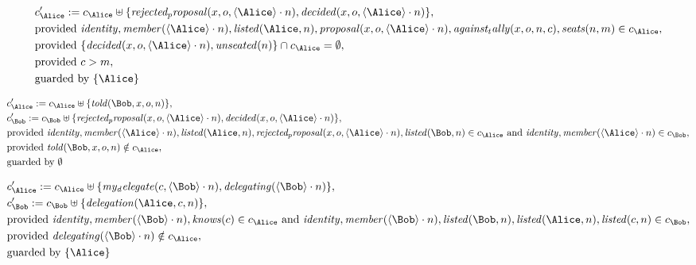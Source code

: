 \begin{align*}
&
c'_
{
\Alice
}
 := 
c_
{
\Alice
}
 \uplus 
\{
\mathit{
rejected_proposal
}
(
x
,
o
,
\langle
\Alice
\rangle
\cdot
n
)
,
\mathit{
decided
}
(
x
,
o
,
\langle
\Alice
\rangle
\cdot
n
)
\}
,\\
&
\text{provided } 
\mathit{
identity
}
,
\mathit{
member
}
(
\langle
\Alice
\rangle
\cdot
n
)
,
\mathit{
listed
}
(
\Alice
,
n
)
,
\mathit{
proposal
}
(
x
,
o
,
\langle
\Alice
\rangle
\cdot
n
)
,
\mathit{
against_tally
}
(
x
,
o
,
n
,
c
)
,
\mathit{
seats
}
(
n
,
m
)
 \in c_
{
\Alice
}
,\\
&
\text{provided } 
\{
\mathit{
decided
}
(
x
,
o
,
\langle
\Alice
\rangle
\cdot
n
)
,
\mathit{
unseated
}
(
n
)
\}
 \cap c_
{
\Alice
}
 = \emptyset
,\\
&
\text{provided } 
c
>
m
,\\
&
\text{guarded by } \{
\Alice
\}
\end{align*}

\begin{align*}
&
c'_
{
\Alice
}
 := 
c_
{
\Alice
}
 \uplus 
\{
\mathit{
told
}
(
\Bob
,
x
,
o
,
n
)
\}
,\\
&
c'_
{
\Bob
}
 := 
c_
{
\Bob
}
 \uplus 
\{
\mathit{
rejected_proposal
}
(
x
,
o
,
\langle
\Alice
\rangle
\cdot
n
)
,
\mathit{
decided
}
(
x
,
o
,
\langle
\Alice
\rangle
\cdot
n
)
\}
,\\
&
\text{provided } 
\mathit{
identity
}
,
\mathit{
member
}
(
\langle
\Alice
\rangle
\cdot
n
)
,
\mathit{
listed
}
(
\Alice
,
n
)
,
\mathit{
rejected_proposal
}
(
x
,
o
,
\langle
\Alice
\rangle
\cdot
n
)
,
\mathit{
listed
}
(
\Bob
,
n
)
 \in c_
{
\Alice
}
 \text{ and } 
\mathit{
identity
}
,
\mathit{
member
}
(
\langle
\Alice
\rangle
\cdot
n
)
 \in c_
{
\Bob
}
,\\
&
\text{provided } 
\mathit{
told
}
(
\Bob
,
x
,
o
,
n
)
 \notin c_
{
\Alice
}
,\\
&
\text{guarded by } \emptyset
\end{align*}

\begin{align*}
&
c'_
{
\Alice
}
 := 
c_
{
\Alice
}
 \uplus 
\{
\mathit{
my_delegate
}
(
c
,
\langle
\Bob
\rangle
\cdot
n
)
,
\mathit{
delegating
}
(
\langle
\Bob
\rangle
\cdot
n
)
\}
,\\
&
c'_
{
\Bob
}
 := 
c_
{
\Bob
}
 \uplus 
\{
\mathit{
delegation
}
(
\Alice
,
c
,
n
)
\}
,\\
&
\text{provided } 
\mathit{
identity
}
,
\mathit{
member
}
(
\langle
\Bob
\rangle
\cdot
n
)
,
\mathit{
knows
}
(
c
)
 \in c_
{
\Alice
}
 \text{ and } 
\mathit{
identity
}
,
\mathit{
member
}
(
\langle
\Bob
\rangle
\cdot
n
)
,
\mathit{
listed
}
(
\Bob
,
n
)
,
\mathit{
listed
}
(
\Alice
,
n
)
,
\mathit{
listed
}
(
c
,
n
)
 \in c_
{
\Bob
}
,\\
&
\text{provided } 
\mathit{
delegating
}
(
\langle
\Bob
\rangle
\cdot
n
)
 \notin c_
{
\Alice
}
,\\
&
\text{guarded by } \{
\Alice
\}
\end{align*}
